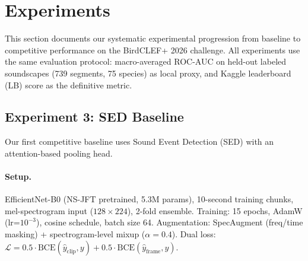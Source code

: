 
\section{Experiments}
\label{sec:experiments}

This section documents our systematic experimental progression from baseline
to competitive performance on the BirdCLEF+ 2026 challenge.
All experiments use the same evaluation protocol: macro-averaged ROC-AUC on
held-out labeled soundscapes (739 segments, 75 species) as local proxy,
and Kaggle leaderboard (LB) score as the definitive metric.

\subsection{Experiment 3: SED Baseline}
\label{sec:exp3}

Our first competitive baseline uses Sound Event Detection (SED) with an
attention-based pooling head.

\paragraph{Setup.}
EfficientNet-B0 (NS-JFT pretrained, 5.3M params), 10-second training chunks,
mel-spectrogram input ($128 \times 224$), 2-fold ensemble.
Training: 15 epochs, AdamW (lr=$10^{-3}$), cosine schedule, batch size 64.
Augmentation: SpecAugment (freq/time masking) + spectrogram-level mixup ($\alpha=0.4$).
Dual loss: $\mathcal{L} = 0.5 \cdot \text{BCE}(\hat{y}_\text{clip}, y) + 0.5 \cdot \text{BCE}(\hat{y}_\text{frame}, y)$.

